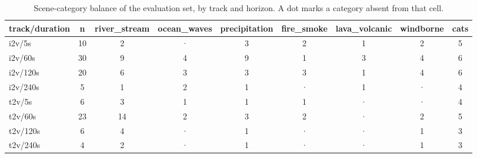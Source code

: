 \begin{table}[!htbp]
\centering
\scriptsize
\setlength{\tabcolsep}{5pt}
\begin{tabular}{lcccccccc}
\toprule
track/duration & n & river\_stream & ocean\_waves & precipitation & fire\_smoke & lava\_volcanic & windborne & cats \\
\midrule
i2v/5s & 10 & 2 & · & 3 & 2 & 1 & 2 & 5 \\
i2v/60s & 30 & 9 & 4 & 9 & 1 & 3 & 4 & 6 \\
i2v/120s & 20 & 6 & 3 & 3 & 3 & 1 & 4 & 6 \\
i2v/240s & 5 & 1 & 2 & 1 & · & 1 & · & 4 \\
t2v/5s & 6 & 3 & 1 & 1 & 1 & · & · & 4 \\
t2v/60s & 23 & 14 & 2 & 3 & 2 & · & 2 & 5 \\
t2v/120s & 6 & 4 & · & 1 & · & · & 1 & 3 \\
t2v/240s & 4 & 2 & · & 1 & · & · & 1 & 3 \\
\bottomrule
\end{tabular}
\caption{Scene-category balance of the evaluation set, by track and horizon. A dot marks a category absent from that cell.}
\label{tab:category}
\end{table}